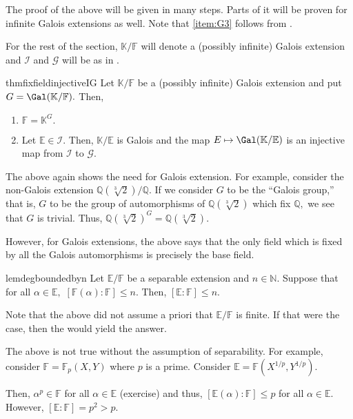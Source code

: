 The proof of the above will be given in many steps. Parts of it will be proven for infinite Galois extensions as well. Note that \ref{item:G3} follows from .

For the rest of the section, $\mathbb{K}/\mathbb{F}$ will denote a {\color{purple}(possibly infinite)} Galois extension and $\mathcal{I}$ and $\mathcal{G}$ will be as in .

\begin{restatable}[]{thm}{fixfieldinjectiveIG}
\label{thm:fixfieldinjectiveIG}
    Let $\mathbb{K}/\mathbb{F}$ be a {\color{purple}(possibly infinite)} Galois extension and put $G = \Gal(\mathbb{K}/\mathbb{F}).$ Then,
    \begin{enumerate}
         \item $\mathbb{F} = \mathbb{K}^G.$
         \item Let $\mathbb{E} \in \mathcal{I}.$ Then, $\mathbb{K}/\mathbb{E}$ is Galois and the map $E \mapsto \Gal(\mathbb{K}/\mathbb{E})$ is an injective map from $\mathcal{I}$ to $\mathcal{G}.$ \hfill\hyperref[thm:fixfieldinjectiveIG2]{\downsym}
     \end{enumerate} 
\end{restatable}

\begin{rem}
    The above again shows the need for Galois extension. For example, consider the non-Galois extension $\mathbb{Q}(\sqrt[3]{2})/\mathbb{Q}.$ If we consider $G$ to be the ``Galois group,'' that is, $G$ to be the group of automorphisms of $\mathbb{Q}(\sqrt[3]{2})$ which fix $\mathbb{Q},$ we see that $G$ is trivial. Thus, $\mathbb{Q}(\sqrt[3]{2})^G = \mathbb{Q}(\sqrt[3]{2}).$

    However, for Galois extensions, the above says that the only field which is fixed by all the Galois automorphisms is precisely the base field.
\end{rem}

\begin{restatable}[]{lem}{degboundedbyn}
\label{lem:degboundedbyn}
    Let $\mathbb{E}/\mathbb{F}$ be a separable extension and $n \in \mathbb{N}.$ Suppose that for all $\alpha \in \mathbb{E},$ $[\mathbb{F}(\alpha) : \mathbb{F}] \le n.$ Then, $[\mathbb{E} : \mathbb{F}] \le n.$ \hfill\hyperref[lem:degboundedbyn2]{\downsym}
\end{restatable}

\begin{rem}
    Note that the above did not assume a priori that $\mathbb{E}/\mathbb{F}$ is finite. If that were the case, then the  would yield the answer.

    The above is not true without the assumption of separability. For example, consider $\mathbb{F} = \mathbb{F}_p(X, Y)$ where $p$ is a prime. Consider $\mathbb{E} = \mathbb{F}(X^{1/p}, Y^{1/p}).$

    Then, $\alpha^p \in \mathbb{F}$ for all $\alpha \in \mathbb{E}$ (exercise) and thus, $[\mathbb{E}(\alpha) : \mathbb{F}] \le p$ for all $\alpha \in \mathbb{E}.$ However, $[\mathbb{E} : \mathbb{F}] = p^2 > p.$
\end{rem}

